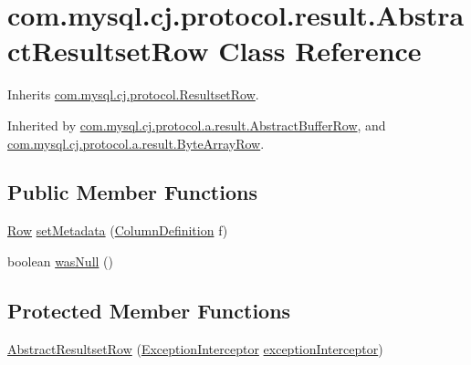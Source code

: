 \hypertarget{classcom_1_1mysql_1_1cj_1_1protocol_1_1result_1_1_abstract_resultset_row}{}\section{com.\+mysql.\+cj.\+protocol.\+result.\+Abstract\+Resultset\+Row Class Reference}
\label{classcom_1_1mysql_1_1cj_1_1protocol_1_1result_1_1_abstract_resultset_row}


Inherits \mbox{\hyperlink{interfacecom_1_1mysql_1_1cj_1_1protocol_1_1_resultset_row}{com.\+mysql.\+cj.\+protocol.\+Resultset\+Row}}.



Inherited by \mbox{\hyperlink{classcom_1_1mysql_1_1cj_1_1protocol_1_1a_1_1result_1_1_abstract_buffer_row}{com.\+mysql.\+cj.\+protocol.\+a.\+result.\+Abstract\+Buffer\+Row}}, and \mbox{\hyperlink{classcom_1_1mysql_1_1cj_1_1protocol_1_1a_1_1result_1_1_byte_array_row}{com.\+mysql.\+cj.\+protocol.\+a.\+result.\+Byte\+Array\+Row}}.

\subsection*{Public Member Functions}
\begin{DoxyCompactItemize}
\item 
\mbox{\hyperlink{interfacecom_1_1mysql_1_1cj_1_1result_1_1_row}{Row}} \mbox{\hyperlink{classcom_1_1mysql_1_1cj_1_1protocol_1_1result_1_1_abstract_resultset_row_a9f17330b25a79a752370017c78d73d08}{set\+Metadata}} (\mbox{\hyperlink{interfacecom_1_1mysql_1_1cj_1_1protocol_1_1_column_definition}{Column\+Definition}} f)
\item 
boolean \mbox{\hyperlink{classcom_1_1mysql_1_1cj_1_1protocol_1_1result_1_1_abstract_resultset_row_a9d1a54529c6a83e356e4d6bf079f8548}{was\+Null}} ()
\end{DoxyCompactItemize}
\subsection*{Protected Member Functions}
\begin{DoxyCompactItemize}
\item 
\mbox{\hyperlink{classcom_1_1mysql_1_1cj_1_1protocol_1_1result_1_1_abstract_resultset_row_a75a4e08e0b2abc8f5f1b4f2c0c59a1cc}{Abstract\+Resultset\+Row}} (\mbox{\hyperlink{interfacecom_1_1mysql_1_1cj_1_1exceptions_1_1_exception_interceptor}{Exception\+Interceptor}} \mbox{\hyperlink{classcom_1_1mysql_1_1cj_1_1protocol_1_1result_1_1_abstract_resultset_row_a50c0daccb2e9e7e2445af4a09d6fb9d0}{exception\+Interceptor}})
\end{DoxyCompactItemize}
